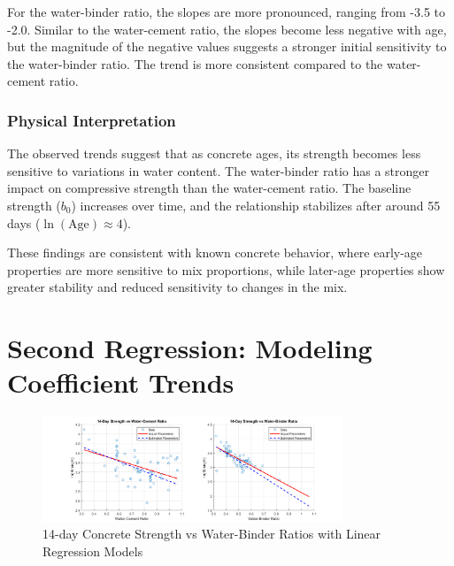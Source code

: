 \documentclass[a4paper,11pt]{article}
\begin{document}
For the water-binder ratio, the slopes are more pronounced, ranging from -3.5 to -2.0. Similar to the water-cement ratio, the slopes become less negative with age, but the magnitude of the negative values suggests a stronger initial sensitivity to the water-binder ratio. The trend is more consistent compared to the water-cement ratio.

\subsubsection*{Physical Interpretation}
The observed trends suggest that as concrete ages, its strength becomes less sensitive to variations in water content. The water-binder ratio has a stronger impact on compressive strength than the water-cement ratio. The baseline strength (\(b_0\)) increases over time, and the relationship stabilizes after around 55 days (\(\ln(\text{Age}) \approx 4\)).

These findings are consistent with known concrete behavior, where early-age properties are more sensitive to mix proportions, while later-age properties show greater stability and reduced sensitivity to changes in the mix. 

\section*{Second Regression: Modeling Coefficient Trends}

\begin{figure}[h]
    \centering
    \includegraphics[width=0.8\textwidth]{second_regression_14_day_Strength_vs_Water_Binder_Ratio.png}
    \caption{14-day Concrete Strength vs Water-Binder Ratios with Linear Regression Models}
    \label{fig:14day_strength_wb_ratio}
\end{figure}
\end{document}
